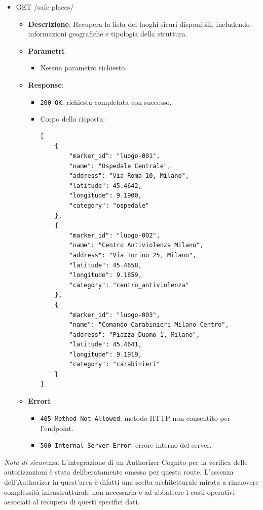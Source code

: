 \documentclass[a4paper,12pt]{article}
\makeatletter
\newcommand\subsubsubsection{\@startsection{paragraph}{4}{\z@}{-2.5ex\@plus -1ex \@minus -.25ex}{1.25ex \@plus .25ex}{\normalfont\normalsize\bfseries}}
\newcommand{\ignoreglossary}{}
\newcommand{\code}[1]{{\ttfamily\textcolor{purple!85!black}{#1}}}
\makeatother
\begin{document}
\subsubsubsection{API associate}
\begin{itemize}
    \item \code{GET /safe-places/}
    \begin{itemize}
        \item \textbf{Descrizione}: Recupera la lista dei luoghi sicuri disponibili, includendo informazioni geografiche e tipologia della struttura.
        
        \item \textbf{Parametri}:
        \begin{itemize}
            \item Nessun parametro richiesto.
        \end{itemize}
        
        \item \textbf{Response}:
        \begin{itemize}
            \item \texttt{200 OK}: richiesta completata con successo.
            \item Corpo della risposta:
\begin{verbatim}
[
    {
        "marker_id": "luogo-001",
        "name": "Ospedale Centrale",
        "address": "Via Roma 10, Milano",
        "latitude": 45.4642,
        "longitude": 9.1900,
        "category": "ospedale"
    },
    {
        "marker_id": "luogo-002",
        "name": "Centro Antiviolenza Milano",
        "address": "Via Torino 25, Milano",
        "latitude": 45.4658,
        "longitude": 9.1859,
        "category": "centro_antiviolenza"
    },
    {
        "marker_id": "luogo-003",
        "name": "Comando Carabinieri Milano Centro",
        "address": "Piazza Duomo 1, Milano",
        "latitude": 45.4641,
        "longitude": 9.1919,
        "category": "carabinieri"
    }
]
\end{verbatim}
        \end{itemize}
        
        \item \textbf{Errori}:
        \begin{itemize}
            \item \texttt{405 Method Not Allowed}: metodo HTTP non consentito per l'endpoint.
            \item \texttt{500 Internal Server Error}: errore interno del server.
        \end{itemize}
    \end{itemize}
\end{itemize}
\textit{Nota di sicurezza}: L'integrazione di un Authorizer Cognito per la \ignoreglossary{verifica} delle autorizzazioni è stata deliberatamente omessa per questa route. L'assenza dell'Authorizer in quest'area è difatti una scelta architetturale mirata a rimuovere complessità infrastrutturale non necessaria e ad abbattere i costi operativi associati al recupero di questi specifici dati.
\end{document}
